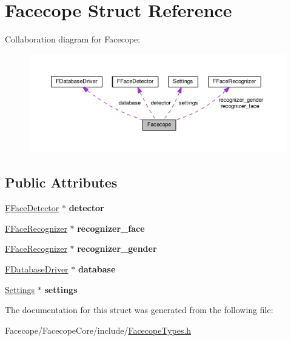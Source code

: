 \hypertarget{structFacecope}{}\section{Facecope Struct Reference}
\label{structFacecope}


Collaboration diagram for Facecope\+:
\nopagebreak
\begin{figure}[H]
\begin{center}
\leavevmode
\includegraphics[width=350pt]{structFacecope__coll__graph}
\end{center}
\end{figure}
\subsection*{Public Attributes}
\begin{DoxyCompactItemize}
\item 
\mbox{\label{structFacecope_ad609003ac3065b7eb4f8968d50a259e8}} 
\hyperlink{classFFaceDetector}{F\+Face\+Detector} $\ast$ {\bfseries detector}
\item 
\mbox{\label{structFacecope_af097e8c7b1a1f206c7784eee1102f878}} 
\hyperlink{classFFaceRecognizer}{F\+Face\+Recognizer} $\ast$ {\bfseries recognizer\+\_\+face}
\item 
\mbox{\label{structFacecope_a04e6ee9ccdaa87c749a4ceeb33675bdf}} 
\hyperlink{classFFaceRecognizer}{F\+Face\+Recognizer} $\ast$ {\bfseries recognizer\+\_\+gender}
\item 
\mbox{\label{structFacecope_a1789673db175e039fe9d9286d89ee1c8}} 
\hyperlink{classFDatabaseDriver}{F\+Database\+Driver} $\ast$ {\bfseries database}
\item 
\mbox{\label{structFacecope_a787a6f57e45567529433bc6f45396559}} 
\hyperlink{classSettings}{Settings} $\ast$ {\bfseries settings}
\end{DoxyCompactItemize}


The documentation for this struct was generated from the following file\+:\begin{DoxyCompactItemize}
\item 
Facecope/\+Facecope\+Core/include/\hyperlink{FacecopeTypes_8h}{Facecope\+Types.\+h}\end{DoxyCompactItemize}
